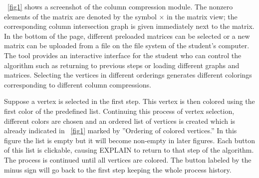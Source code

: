 \documentclass[12pt, twoside]{book}
\begin{document}
\figurename~\ref{fig1} shows a screenshot of the column compression module. The nonzero elements of the matrix are denoted by the symbol $\times$ in the matrix view; the corresponding column intersection graph is given immediately next to the matrix. In the bottom of the page, different preloaded matrices can be selected or a new matrix can be uploaded from a file on the file system of the student's computer. The tool provides an interactive interface for the student who can control the algorithm such as returning to previous steps or loading different graphs and matrices. Selecting the vertices in different orderings generates different colorings corresponding to different column compressions.

Suppose a vertex is selected in the first step. This vertex is then colored using the first color of the predefined list. Continuing this process of vertex selection, different colors are chosen and an ordered list of vertices is created which is already indicated in \figurename~\ref{fig1} marked by ''Ordering of colored vertices.'' In this figure the list is empty but it will become non-empty in later figures. Each button of this list is clickable, causing \mbox{EXPLAIN} to return to that step of the algorithm. The process is continued until all vertices are colored. The button labeled by the minus sign will go back to the first step keeping the whole process history.
\end{document}
